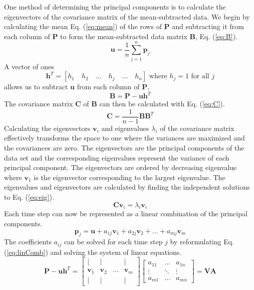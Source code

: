 \documentclass[smallextended]{svjour3}     %
\begin{document}
One method of determining the principal components is to calculate the
eigenvectors of the covariance matrix of the mean-subtracted data. We begin by
calculating the mean Eq. (\ref{eq:mean}) of the rows of $\mathbf{P}$ and
subtracting it from each column of $\mathbf{P}$ to form the mean-subtracted
data matrix $\mathbf{B}$, Eq. (\ref{eq:B}).
\begin{equation}
    \mathbf{u}=\frac{1}{n}\sum_{j=1}^n\mathbf{p}_j
    \label{eq:mean}
\end{equation}
A vector of ones
\begin{displaymath}
    \mathbf{h}^T=\left[h_1\quad h_2\quad\ldots\quad h_j\quad\ldots\quad h_n\right]
    \textrm{ where }h_j=1\textrm{ for all }j
    \label{eq:h}
\end{displaymath}
allows us to subtract $\mathbf{u}$ from each column of $\mathbf{P}$,
\begin{equation}
    \mathbf{B}=\mathbf{P}-\mathbf{u}\mathbf{h}^T
    \label{eq:B}
\end{equation}
The covariance matrix $\mathbf{C}$ of $\mathbf{B}$ can then be calculated with
Eq. (\ref{eq:C}).
\begin{equation}
    \mathbf{C}=\frac{1}{n-1}\mathbf{B}{\mathbf{B}^T}
    \label{eq:C}
\end{equation}
Calculating the eigenvectors $\mathbf{v}_i$ and eigenvalues $\lambda_i$ of the
covariance matrix effectively transforms the space to one where the variances
are maximized and the covariances are zero. The eigenvectors are the principal
components of the data set and the corresponding eigenvalues represent the
variance of each principal component. The eigenvectors are ordered by
decreasing eigenvalue where $\mathbf{v}_1$ is the eigenvector corresponding to
the largest eigenvalue. The eigenvalues and eigenvectors are calculated by
finding the independent solutions to Eq. (\ref{eq:eig}).
\begin{equation}
    \mathbf{C}\mathbf{v}_i=\lambda_i\mathbf{v}_i
    \label{eq:eig}
\end{equation}
Each time step can now be represented as a linear combination of the principal
components.
\begin{equation}
    \mathbf{p}_j=\mathbf{u}+a_{1j}\mathbf{v}_1+a_{2j}\mathbf{v}_2+\ldots+a_{mj}\mathbf{v}_m
    \label{eq:linComb}
\end{equation}
The coefficients $a_{ij}$ can be solved for each time step $j$ by reformulating
Eq. (\ref{eq:linComb}) and solving the system of linear equations.
\begin{equation}
    \mathbf{P}-\mathbf{u}\mathbf{h}^T=
    \left[\begin{array}{cccc}
        | & | & & |\\
        \mathbf{v}_1 & \mathbf{v}_2 & \ldots & \mathbf{v}_m\\
        | & | & & |
    \end{array}\right]
    \left[\begin{array}{ccc}
    a_{11} & \ldots & a_{1n}\\
    \vdots & \ddots & \vdots\\
    a_{m1} & \ldots & a_{mn}
    \end{array}\right]
    =\mathbf{V}\mathbf{A}
\end{equation}
\end{document}
